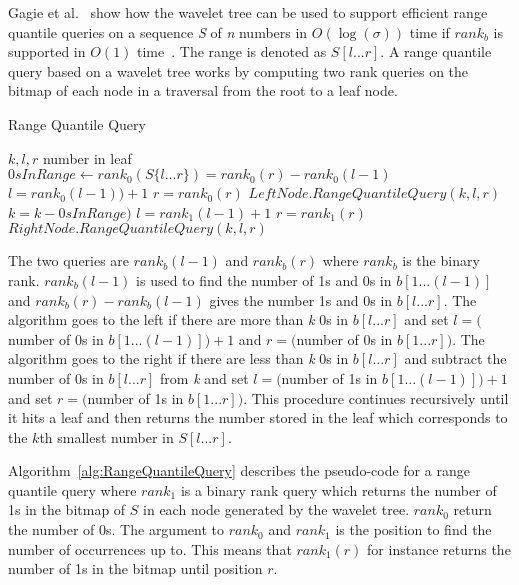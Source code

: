 Gagie et al.~ show how the wavelet tree can be used to support efficient range quantile queries on a sequence \textit{S} of \textit{n} numbers in $O(\log(\sigma))$ time if $rank_b$ is supported in $O(1)$ time~. 
The range is denoted as $S[l ... r]$.
A range quantile query based on a wavelet tree works by computing two rank queries on the bitmap of each node in a traversal from the root to a leaf node. 

\begin{algorithm}
\caption{Range Quantile Query}
\label{alg:RangeQuantileQuery}
\begin{algorithmic}
 {$k,l,r$}
	\State \Return number in leaf
\EndIf
\State $\textit{0}sInRange \gets rank_0(S \lbrace l...r \rbrace) = rank_0(r) - rank_0(l-1)$
	\State $l = rank_0(l-1))+1$
	\State $r = rank_0(r)$
	\State \Return $LeftNode.RangeQuantileQuery(k,l,r)$
\Else
	\State $k = k - \textit{0}sInRange)$
	\State $l = rank_1(l-1)+1$
	\State $r = rank_1(r)$
	\State \Return $RightNode.RangeQuantileQuery(k,l,r)$
\EndIf

\EndFunction
\end{algorithmic}
\end{algorithm}

The two queries are $rank_b(l-1)$ and $rank_b(r)$ where $rank_b$ is the binary rank.
$rank_b(l-1)$ is used to find the number of 1s and 0s in $b[1...(l-1)]$ and $rank_b(r) - rank_b(l-1)$ gives the number 1s and 0s in $b[l...r]$. 
The algorithm goes to the left if there are more than \textit{k} 0s in $b[l...r]$ and set $l = ($number of 0s in $b[1...(l-1)])+1$ and $r=($number of 0s in $b[1...r])$. 
The algorithm goes to the right if there are less than \textit{k} 0s in $b[l...r]$ and subtract the number of 0s in $b[l...r]$ from \textit{k} and set $l = ($number of 1s in $b[1...(l-1)])+1$ and set $r=($number of 1s in $b[1...r])$. 
This procedure continues recursively until it hits a leaf and then returns the number stored in the leaf which corresponds to the $k$th smallest number in $S[l...r]$.

Algorithm~\ref{alg:RangeQuantileQuery} describes the pseudo-code for a range quantile query where $rank_1$ is a binary rank query which returns the number of 1s in the bitmap of $S$ in each node generated by the wavelet tree. 
$rank_0$ return the number of 0s.
The argument to $rank_0$ and $rank_1$ is the position to find the number of occurrences up to.
This means that $rank_1(r)$ for instance returns the number of 1s in the bitmap until position $r$.

